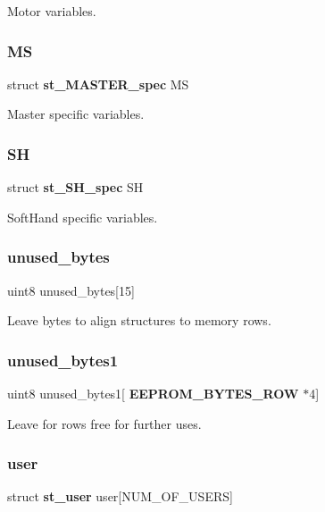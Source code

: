 Motor variables. \mbox{\label{structst__eeprom_ab2f591c243365039926d9b449d7fbc46}} 
\subsubsection{MS}
{\footnotesize\ttfamily struct \textbf{ st\+\_\+\+M\+A\+S\+T\+E\+R\+\_\+spec} MS}

Master specific variables. \mbox{\label{structst__eeprom_a48c2a3988657edd4d6b92f84a0d9d2d0}} 
\subsubsection{SH}
{\footnotesize\ttfamily struct \textbf{ st\+\_\+\+S\+H\+\_\+spec} SH}

Soft\+Hand specific variables. \mbox{\label{structst__eeprom_a23db079f0c6d3e264be3fb547f32403c}} 
\subsubsection{unused\+\_\+bytes}
{\footnotesize\ttfamily uint8 unused\+\_\+bytes[15]}

Leave bytes to align structures to memory rows. \mbox{\label{structst__eeprom_a0299e605ae8eb46c7aa7886e6b302a0f}} 
\subsubsection{unused\+\_\+bytes1}
{\footnotesize\ttfamily uint8 unused\+\_\+bytes1[\textbf{ E\+E\+P\+R\+O\+M\+\_\+\+B\+Y\+T\+E\+S\+\_\+\+R\+OW} $\ast$4]}

Leave for rows free for further uses. \mbox{\label{structst__eeprom_a59282a1a28a7fc333cd680c9a8988b93}} 
\subsubsection{user}
{\footnotesize\ttfamily struct \textbf{ st\+\_\+user} user[N\+U\+M\+\_\+\+O\+F\+\_\+\+U\+S\+E\+RS]}

